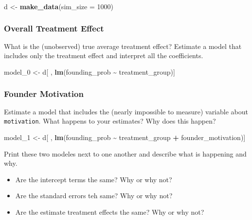 \documentclass[
]{article}
\newenvironment{Shaded}{\begin{snugshade}}{\end{snugshade}}
\newcommand{\AttributeTok}[1]{\textcolor[rgb]{0.13,0.29,0.53}{#1}}
\newcommand{\DecValTok}[1]{\textcolor[rgb]{0.00,0.00,0.81}{#1}}
\newcommand{\FunctionTok}[1]{\textcolor[rgb]{0.13,0.29,0.53}{\textbf{#1}}}
\newcommand{\NormalTok}[1]{#1}
\newcommand{\OtherTok}[1]{\textcolor[rgb]{0.56,0.35,0.01}{#1}}
\newcommand{\SpecialCharTok}[1]{\textcolor[rgb]{0.81,0.36,0.00}{\textbf{#1}}}
\providecommand{\tightlist}{%
  \setlength{\itemsep}{0pt}\setlength{\parskip}{0pt}}
\theoremstyle{definition}
\theoremstyle{definition}
\theoremstyle{definition}
\theoremstyle{definition}
\theoremstyle{remark}
\begin{document}
\begin{Shaded}
\begin{Highlighting}[]
\NormalTok{d }\OtherTok{\textless{}{-}} \FunctionTok{make\_data}\NormalTok{(}\AttributeTok{sim\_size =} \DecValTok{1000}\NormalTok{)}
\end{Highlighting}
\end{Shaded}

\subsubsection{Overall Treatment Effect}\label{overall-treatment-effect}

What is the (unobserved) true average treatment effect? Estimate a model that includes only the treatment effect and interpret all the coefficients.

\begin{Shaded}
\begin{Highlighting}[]
\NormalTok{model\_0 }\OtherTok{\textless{}{-}}\NormalTok{ d[ , }\FunctionTok{lm}\NormalTok{(founding\_prob }\SpecialCharTok{\textasciitilde{}}\NormalTok{ treatment\_group)]}
\end{Highlighting}
\end{Shaded}

\subsubsection{Founder Motivation}\label{founder-motivation}

Estimate a model that includes the (nearly impossible to measure) variable about \texttt{motivation}. What happens to your estimates? Why does this happen?

\begin{Shaded}
\begin{Highlighting}[]
\NormalTok{model\_1 }\OtherTok{\textless{}{-}}\NormalTok{ d[ , }\FunctionTok{lm}\NormalTok{(founding\_prob }\SpecialCharTok{\textasciitilde{}}\NormalTok{ treatment\_group }\SpecialCharTok{+}\NormalTok{ founder\_motivation)]}
\end{Highlighting}
\end{Shaded}

Print these two modeles next to one another and describe what is happening and why.

\begin{itemize}
\tightlist
\item
  Are the intercept terms the same? Why or why not?
\item
  Are the standard errors teh same? Why or why not?
\item
  Are the estimate treatment effects the same? Why or why not?
\end{itemize}
\end{document}
